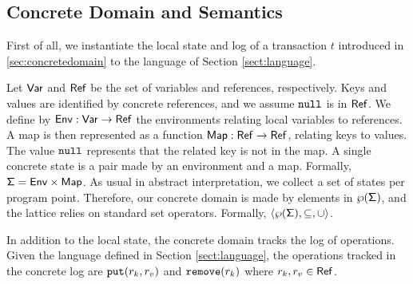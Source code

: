 \subsection{Concrete Domain and Semantics}
\label{sec:concretemap}
First of all, we instantiate the local state and log of a transaction $t$ introduced in \ref{sec:concretedomain} to the language of Section \ref{sect:language}.

Let $\mathsf{Var}$ and $\mathsf{Ref}$ be the set of variables and references, respectively. Keys and values are identified by concrete references, and we assume $\mathtt{null}$ is in $\mathsf{Ref}$. We define by $\mathsf{Env} : \mathsf{Var} \to \mathsf{Ref}$ the environments relating local variables to references. A map is then represented as a function $\mathsf{Map} : \mathsf{Ref} \to \mathsf{Ref}$, relating keys to values. The value $\mathtt{null}$ represents that the related key is not in the map. A single concrete state is a pair made by an environment and a map. Formally, $\mathsf{\Sigma} = \mathsf{Env} \times \mathsf{Map}$. As usual in abstract interpretation, we collect a set of states per program point. Therefore, our concrete domain is made by elements in $\wp(\mathsf{\Sigma})$, and the lattice relies on standard set operators. Formally, $\langle \wp(\mathsf{\Sigma}), \subseteq, \cup \rangle$.

In addition to the local state, the concrete domain tracks the log of operations. Given the language defined in Section \ref{sect:language}, the operations tracked in the concrete log are $\mathtt{put}(r_k, r_v)$ and $\mathtt{remove}(r_k)$ where $r_k, r_v \in \mathsf{Ref}$.


